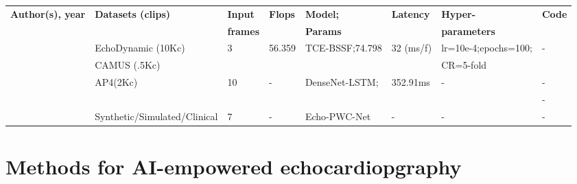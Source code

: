 \begin{table}[]
\tiny
\begin{tabular}{llllllll}
\textbf{Author(s), year} & \textbf{Datasets (clips)}           & \textbf{Input}        & \textbf{Flops} & \textbf{Model;} & \textbf{Latency}  & \textbf{Hyper-}      & \textbf{Code} \\
                         &                                     & \textbf{frames}       &                & \textbf{Params}      &                   & \textbf{parameters}  &               \\
\cite{wu20222}           &  EchoDynamic (10Kc)                 & 3                     & 56.359         & TCE-BSSF;74.798      & 32 (ms/f)         & lr=10e-4;epochs=100; & -             \\
                         &  CAMUS (.5Kc)                       &                       &                &                       &                   & CR=5-fold            &          \\
\cite{woudenberg2018}    & AP4(2Kc)                            & 10                    & -              & DenseNet-LSTM;        & 352.91ms          & -                    & -             \\
                         &                                     &                       &                &                       &                   &                      & - \\
\cite{ostvik2021-TMI}   & Synthetic/Simulated/Clinical         & 7                     & -              & Echo-PWC-Net          & -                   & -                      & -
\end{tabular}
\end{table}






\section{Methods for AI-empowered echocardiopgraphy}

